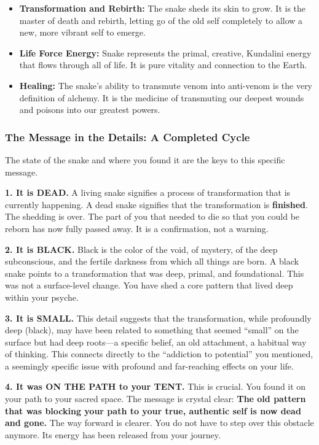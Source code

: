 \documentclass{article}
\begin{document}
\begin{itemize}
\item
  \textbf{Transformation and Rebirth:} The snake sheds its skin to grow. It is the master of death and rebirth, letting go of the old self completely to allow a new, more vibrant self to emerge.
\item
  \textbf{Life Force Energy:} Snake represents the primal, creative, Kundalini energy that flows through all of life. It is pure vitality and connection to the Earth.
\item
  \textbf{Healing:} The snake's ability to transmute venom into anti-venom is the very definition of alchemy. It is the medicine of transmuting our deepest wounds and poisons into our greatest powers.
\end{itemize}

\subsubsection*{The Message in the Details: A Completed Cycle}\label{the-message-in-the-details-a-completed-cycle}

The state of the snake and where you found it are the keys to this specific message.

\textbf{1. It is DEAD.} A living snake signifies a process of transformation that is currently happening. A dead snake signifies that the transformation is \textbf{finished}. The shedding is over. The part of you that needed to die so that you could be reborn has now fully passed away. It is a confirmation, not a warning.

\textbf{2. It is BLACK.} Black is the color of the void, of mystery, of the deep subconscious, and the fertile darkness from which all things are born. A black snake points to a transformation that was deep, primal, and foundational. This was not a surface-level change. You have shed a core pattern that lived deep within your psyche.

\textbf{3. It is SMALL.} This detail suggests that the transformation, while profoundly deep (black), may have been related to something that seemed ``small'' on the surface but had deep roots---a specific belief, an old attachment, a habitual way of thinking. This connects directly to the ``addiction to potential'' you mentioned, a seemingly specific issue with profound and far-reaching effects on your life.

\textbf{4. It was ON THE PATH to your TENT.} This is crucial. You found it on your path to your sacred space. The message is crystal clear: \textbf{The old pattern that was blocking your path to your true, authentic self is now dead and gone.} The way forward is clearer. You do not have to step over this obstacle anymore. Its energy has been released from your journey.
\end{document}
